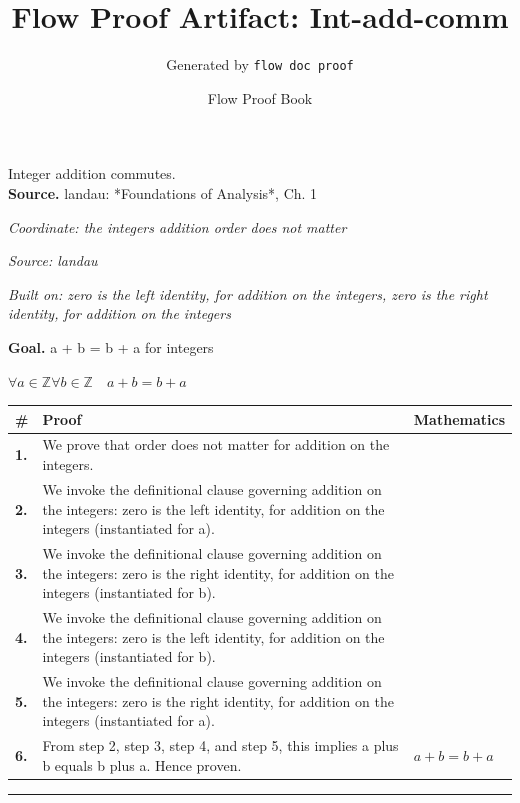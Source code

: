 \documentclass[11pt]{article}
\title{Flow Proof Artifact: Int-add-comm}
\author{Generated by \texttt{flow doc proof}}
\date{Flow Proof Book}
\theoremstyle{definition}
\begin{document}
\maketitle
Integer addition commutes.\\[0.5em]
\textbf{Source.} landau: *Foundations of Analysis*, Ch. 1\\[0.5em]
\bigskip
{}\par
\smallskip\noindent\textit{Coordinate: the integers \cdot addition \cdot order does not matter}\par
\smallskip\noindent\textit{Source: landau}\par
\smallskip\noindent\textit{Built on: zero is the left identity, for addition on the integers, zero is the right identity, for addition on the integers}\par
\medskip
\noindent\textbf{Goal.} a + b = b + a for integers\par
\noindent$\displaystyle \forall a \in \mathbb{Z} \forall b \in \mathbb{Z}\quad a + b = b + a$\par
\medskip
\noindent
\begin{tabular}{@{} >{\raggedright\arraybackslash}p{} >{\raggedright\arraybackslash}p{} >{\raggedleft\arraybackslash}p{} @{}}
\textbf{\#} & \textbf{Proof} & \textbf{Mathematics} \\
\midrule
\textbf{1.} & We prove that order does not matter for addition on the integers. & \\[0.45em]
\textbf{2.} & We invoke the definitional clause governing addition on the integers: zero is the left identity, for addition on the integers (instantiated for a). & \\[0.45em]
\textbf{3.} & We invoke the definitional clause governing addition on the integers: zero is the right identity, for addition on the integers (instantiated for b). & \\[0.45em]
\textbf{4.} & We invoke the definitional clause governing addition on the integers: zero is the left identity, for addition on the integers (instantiated for b). & \\[0.45em]
\textbf{5.} & We invoke the definitional clause governing addition on the integers: zero is the right identity, for addition on the integers (instantiated for a). & \\[0.45em]
\textbf{6.} & From step 2, step 3, step 4, and step 5, this implies a plus b equals b plus a. Hence proven. & $\displaystyle a + b = b + a$ \\[0.45em]
\bottomrule
\end{tabular}
\label{thm:Int-addition-order_does_not_matter}
\par\medskip\hrule
\end{document}

